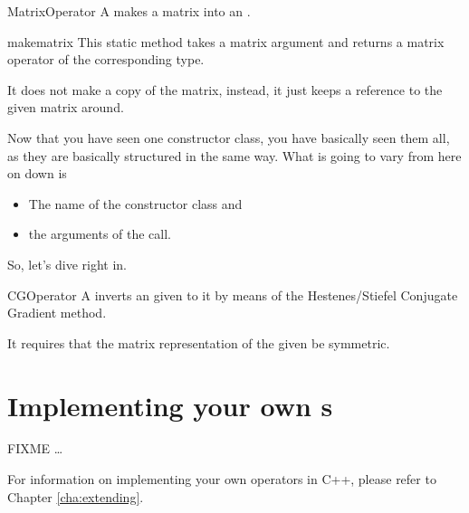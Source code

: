 \begin{classdesc*}{MatrixOperator}
  A  makes a matrix into an .
\end{classdesc*}
\begin{methoddesc}{make}{matrix}
  This static method takes a matrix argument and returns a matrix
  operator of the corresponding type.

  It does not make a copy of the matrix, instead, it just keeps
  a reference to the given matrix around.
\end{methoddesc}

Now that you have seen one constructor class, you have basically
seen them all, as they are basically structured in the same way.
What is going to vary from here on down is
\begin{itemize}
\item The name of the constructor class and
\item the arguments of the  call.
\end{itemize}

So, let's dive right in.
\begin{classdesc*}{CGOperator}
  A  inverts an  given to it
  by means of the Hestenes/Stiefel Conjugate Gradient method.

  It requires that the matrix representation of the given 
   be symmetric.
\end{classdesc*}


\section{Implementing your own s}

FIXME \dots

For information on implementing your own operators in C++, please
refer to Chapter \ref{cha:extending}.
